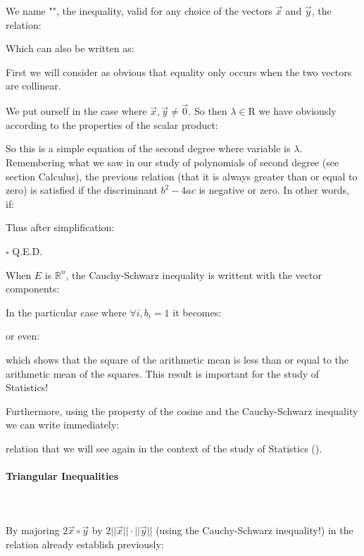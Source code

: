 	\begin{theorem}
	We name "", the inequality, valid for any choice of the vectors $\vec{x}$ and $\vec{y}$, the relation:
	
	Which can also be written as:
	
	\end{theorem}
	First we will consider as obvious that equality only occurs when the two vectors are collinear.	
	\begin{dem}
	We put ourself in the case where $\vec{x},\vec{y}\neq\vec{0}$. So then $\lambda\in\mathrm{R}$ we have obviously according to the properties of the scalar product:
	
	So this is a simple equation of the second degree where variable is $\lambda$. Remembering what we saw in our study of polynomials of second degree (see section Calculus), the previous relation (that it is always greater than or equal to zero) is satisfied if the discriminant $b^2-4ac$ is negative or zero. In other words, if:
	
	Thus after simplification:
	
	\begin{flushright}
		$\square$  Q.E.D.
	\end{flushright}
	\end{dem}
	When $E$ is $\mathbb{R}^n$, the Cauchy-Schwarz inequality is writtent with the vector components:
	
	In the particular case where $\forall i,b_i=1$ it becomes:
	
	or even:
	
	which shows that the square of the arithmetic mean is less than or equal to the arithmetic mean of the squares. This result is important for the study of Statistics!
	
	Furthermore, using the property of the cosine and the Cauchy-Schwarz inequality we can write immediately:
	
	relation that we will see again in the context of the study of Statistics ().
	
	\paragraph{Triangular Inequalities}\mbox{}\\\\
	By majoring $2\vec{x}\circ\vec{y}$ by $2||\vec{x}||\cdot||\vec{y}||$ (using the Cauchy-Schwarz inequality!) in the relation already establish previously:
	
